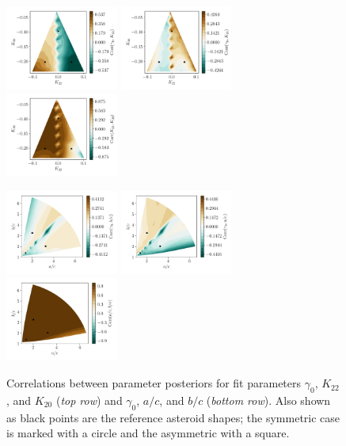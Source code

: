 \documentclass[fleqn,usenatbib]{mnras}
\begin{document}
\begin{figure}
  \includegraphics[width=0.33\textwidth]{figs/probe-space-corr12.pdf}\hfill
  \includegraphics[width=0.33\textwidth]{figs/probe-space-corr13.pdf}\hfill
  \includegraphics[width=0.33\textwidth]{figs/probe-space-corr23.pdf}

  \includegraphics[width=0.33\textwidth]{figs/probe-space-ab-1b.pdf}\hfill
  \includegraphics[width=0.33\textwidth]{figs/probe-space-ab-1a.pdf}\hfill
  \includegraphics[width=0.33\textwidth]{figs/probe-space-ab-ab.pdf}
  
  \caption{Correlations between parameter posteriors for fit parameters $\gamma_0$, $K_{22}$, and $K_{20}$ (\textit{top row}) and $\gamma_0$, $a/c$, and $b/c$ (\textit{bottom row}).  Also shown as black points are the reference asteroid shapes; the symmetric case is marked with a circle and the asymmetric with a square.}
  \label{fig:scan-space-corr}
\end{figure}
\end{document}
